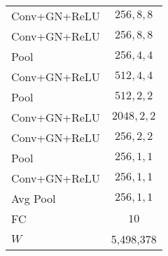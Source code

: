 \begin{tabular}{|l|c|}
    Conv+GN+ReLU & $256, 8, 8$\\
    Conv+GN+ReLU & $256, 8, 8$\\
    Pool & $256, 4, 4$\\
    Conv+GN+ReLU & $512, 4, 4$\\
    Pool & $512, 2, 2$\\
    Conv+GN+ReLU & $2048, 2, 2$\\
    Conv+GN+ReLU & $256, 2, 2$\\
    Pool & $256, 1, 1$\\
    Conv+GN+ReLU & $256, 1, 1$\\
    Avg Pool & $256, 1, 1$\\
    FC & $10$\\
    \hline
    \hline
    $W$ & 5,498,378\\
    \hline
\end{tabular}